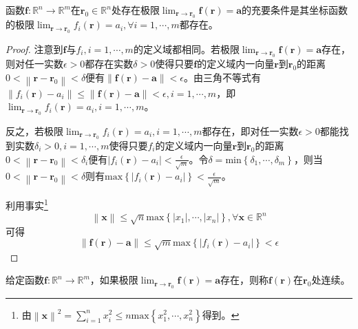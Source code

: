 \documentclass[main.tex]{subfiles}
\begin{document}
\begin{theorem}\label{thm:II.13.2}
函数$\mathbf{f}:\mathbb{R}^n\rightarrow\mathbb{R}^m$在$\mathbf{r}_0\in\mathbb{R}^n$处存在极限$\lim_{\mathbf{r}\to\mathbf{r}_0}\mathbf{f}\left(\mathbf{r}\right)=\mathbf{a}$的充要条件是其坐标函数的极限$\lim_{\mathbf{r}\to\mathbf{r}_0}f_i\left(\mathbf{r}\right)=a_i,\forall i=1,\cdots,m$都存在。
\end{theorem}
\begin{proof}
注意到$\mathbf{f}$与$f_i,i=1,\cdots,m$的定义域都相同。若极限$\lim_{\mathbf{r}\to\mathbf{r}_0}\mathbf{f}\left(\mathbf{r}\right)=\mathbf{a}$存在，则对任一实数$\epsilon>0$都存在实数$\delta>0$使得只要$\mathbf{f}$的定义域内一向量$\mathbf{r}$到$\mathbf{r}_0$的距离$0<\left\|\mathbf{r}-\mathbf{r}_0\right\|<\delta$便有$\left\|\mathbf{f}\left(\mathbf{r}\right)-\mathbf{a}\right\|<\epsilon$。由三角不等式有$\left\|f_i\left(\mathbf{r}\right)-a_i\right\|\leq\left\|\mathbf{f}\left(\mathbf{r}\right)-\mathbf{a}\right\|<\epsilon,i=1,\cdots,m$，即$\lim_{\mathbf{r}\to\mathbf{r}_0}f_i\left(\mathbf{r}\right)=a_i,i=1,\cdots,m$。

反之，若极限$\lim_{\mathbf{r}\to\mathbf{r}_0}f_i\left(\mathbf{r}\right)=a_i,i=1,\cdots,m$都存在，即对任一实数$\epsilon>0$都能找到实数$\delta_i>0,i=1,\cdots,m$使得只要$f_i$的定义域内一向量$\mathbf{r}$到$\mathbf{r}_0$的距离$0<\left\|\mathbf{r}-\mathbf{r}_0\right\|<\delta_i$便有$\left|f_i\left(\mathbf{r}\right)-a_i\right|<\frac{\epsilon}{\sqrt{m}}$。令$\delta=\mathrm{min}\left\{\delta_1,\cdots,\delta_m\right\}$，则当$0<\left\|\mathbf{r}-\mathbf{r}_0\right\|<\delta$则有$\mathrm{max}\left\{\left|f_i\left(\mathbf{r}\right)-a_i\right|\right\}<\frac{\epsilon}{\sqrt{m}}$。

利用事实\footnote{
由$\left\|\mathbf{x}\right\|^2=\sum_{i=1}^nx_i^2\leq n\mathrm{max}\left\{x_1^2,\cdots,x_n^2\right\}$得到。
}
\[\left\|\mathbf{x}\right\|\leq\sqrt{n}\mathrm{max}\left\{\left|x_1\right|,\cdots,\left|x_n\right|\right\},\forall\mathbf{x}\in\mathbb{R}^n\]
可得
\[\left\|\mathbf{f}\left(\mathbf{r}\right)-\mathbf{a}\right\|\leq\sqrt{m}\mathrm{max}\left\{\left|f_i\left(\mathbf{r}\right)-a_i\right|\right\}<\epsilon\]
\end{proof}

\begin{definition}[函数的连续性]
给定函数$\mathbf{f}:\mathbb{R}^n\rightarrow\mathbb{R}^m$，如果极限$\lim_{\mathbf{r}\to\mathbf{r}_0}\mathbf{f}\left(\mathbf{r}\right)=\mathbf{a}$存在，则称$\mathbf{f}\left(\mathbf{r}\right)$在$\mathbf{r}_0$处连续。
\end{definition}
\end{document}
